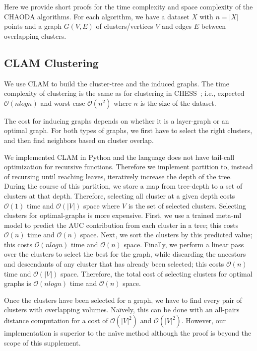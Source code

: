 Here we provide short proofs for the time complexity and space complexity of the CHAODA algorithms.
For each algorithm, we have
a dataset $X$ with $n = |X|$ points and
a graph $G(V, E)$ of clusters/vertices $V$ and edges $E$ between overlapping clusters.


\subsection{CLAM Clustering}

We use CLAM to build the cluster-tree and the induced graphs.
The time complexity of clustering is the same as for clustering in CHESS~\cite{ishaq2019clustered}; i.e., expected $\mathcal{O}(nlogn)$ and worst-case $\mathcal{O}(n^2)$ where $n$ is the size of the dataset.

The cost for inducing graphs depends on whether it is a layer-graph or an optimal graph.
For both types of graphs, we first have to select the right clusters, and then find neighbors based on cluster overlap.

We implemented CLAM in Python and the language does not have tail-call optimization for recursive functions.
Therefore we implement partition to, instead of recursing until reaching leaves, iteratively increase the depth of the tree.
During the course of this partition, we store a map from tree-depth to a set of clusters at that depth.
Therefore, selecting all cluster at a given depth costs $\mathcal{O}(1)$ time and $\mathcal{O}(|V|)$ space where $V$ is the set of selected clusters.
Selecting clusters for optimal-graphs is more expensive.
First, we use a trained meta-ml model to predict the AUC contribution from each cluster in a tree; this costs $\mathcal{O}(n)$ time and $\mathcal{O}(n)$ space.
Next, we sort the clusters by this predicted value; this costs $\mathcal{O}(nlogn)$ time and $\mathcal{O}(n)$ space.
Finally, we perform a linear pass over the clusters to select the best for the graph, while discarding the ancestors and descendants of any cluster that has already been selected; this costs $\mathcal{O}(n)$ time and $\mathcal{O}(|V|)$ space.
Therefore, the total cost of selecting clusters for optimal graphs is $\mathcal{O}(nlogn)$ time and $\mathcal{O}(n)$ space.

Once the clusters have been selected for a graph, we have to find every pair of clusters with overlapping volumes.
Na\"ively, this can be done with an all-pairs distance computation for a cost of $\mathcal{O}(|V|^2)$ and $\mathcal{O}(|V|^2)$.
However, our implementation is superior to the na\"ive method although the proof is beyond the scope of this supplement.


